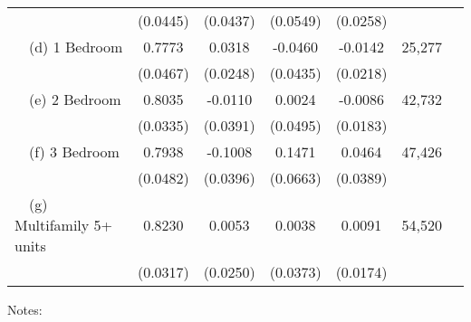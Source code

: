 \begin{table}
\begin{tabular}{@{}lcccccc@{}}
                                                             & (0.0445) & (0.0437) & (0.0549) & (0.0258) &      \\
        $\quad$(d) 1 Bedroom                                 &  0.7773  &  0.0318  &  -0.0460  &  -0.0142  & 25,277 \\
                                                             & (0.0467) & (0.0248) & (0.0435) & (0.0218) &      \\
        $\quad$(e) 2 Bedroom                                 &  0.8035  &  -0.0110  &  0.0024  &  -0.0086  & 42,732 \\
                                                             & (0.0335) & (0.0391) & (0.0495) & (0.0183) &      \\
        $\quad$(f) 3 Bedroom                                 &  0.7938  &  -0.1008  &  0.1471  &  0.0464  & 47,426 \\
                                                             & (0.0482) & (0.0396) & (0.0663) & (0.0389) &      \\
        $\quad$(g) Multifamily 5+ units                      &  0.8230  &  0.0053  &  0.0038  &  0.0091  & 54,520 \\
                                                             & (0.0317) & (0.0250) & (0.0373) & (0.0174) &      \\ \bottomrule
    \end{tabular}

    \begin{minipage}{.95\textwidth} \footnotesize
        \vspace{2mm}
        Notes: 
        
    \end{minipage}
\end{table}
